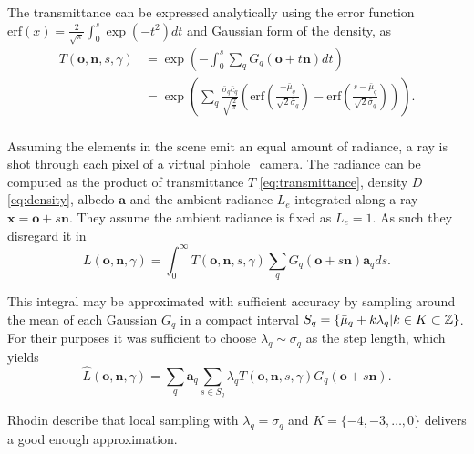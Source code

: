 \documentclass[a4paper, 11pt]{memoir}
\newcommand*{\erf}{\text{erf}}
\begin{document}
    The \gls{transmittance} can be expressed analytically using the error function
    $\erf{(x)} = \frac{2}{\sqrt{\pi}}\int_0^s \exp{(-t^2)} dt$ and Gaussian form of the density, as
    \begin{equation}
        \begin{aligned}
            T(\mathbf{o}, \mathbf{n}, s, \gamma) &= \exp{\left( -\int_0^s
                \sum_q G_q(\mathbf{o} + t\mathbf{n} ) dt \right)}\\
            &= \exp{\left( \sum_q \frac{\bar{\sigma}_q \bar{c}_q}{\sqrt{\frac{2}{\pi}}}
            \left( \erf{\left( \frac{-\bar{\mu}_q}{\sqrt{2}\bar{\sigma}_q} \right)}
            - \erf{\left( \frac{s - \bar{\mu}_q}{\sqrt{2}\bar{\sigma}_q} \right)} \right) \right)}.\\
        \end{aligned}
        \label{eq:transmittance_analytical}
    \end{equation}

    Assuming the elements in the scene emit an equal amount of \gls{radiance}, a ray is shot through each pixel of a virtual
    \gls{pinhole_camera}. The \gls{radiance} can be computed as the product of \gls{transmittance} $T$ \eqref{eq:transmittance},
    density $D$ \eqref{eq:density}, \gls{albedo} $\mathbf{a}$ and the ambient \gls{radiance} $L_e$ integrated along a ray
    $\mathbf{x} = \mathbf{o} + s\mathbf{n}$. They assume the ambient \gls{radiance} is fixed as $L_e = 1$. As such they
    disregard it in
    \begin{equation}
        L(\mathbf{o}, \mathbf{n}, \gamma) = \int_0^\infty T(\mathbf{o}, \mathbf{n}, s, \gamma)
            \sum_q G_q(\mathbf{o} + s\mathbf{n})\mathbf{a}_q ds.
    \end{equation}
    
    This integral may be approximated with sufficient accuracy by sampling around the mean of each Gaussian $G_q$ in
    a compact interval $S_q = \{ \bar{\mu}_q + k\lambda_q | k \in K \subset \mathbb{Z} \}$. For their purposes it was sufficient
    to choose $\lambda_q \sim \bar{\sigma}_q$ as the step length, which yields
    \begin{equation}
        \hat{L}(\mathbf{o}, \mathbf{n}, \gamma) = \sum_q \mathbf{a}_q \sum_{s \in S_q}
            \lambda_q T(\mathbf{o}, \mathbf{n}, s, \gamma)G_q(\mathbf{o} + s\mathbf{n}).
        \label{eq:radiance}
    \end{equation}

    Rhodin \etal describe that local sampling with $\lambda_q = \bar{\sigma}_q$ and $K = \{ -4, -3, \dots, 0 \}$
    delivers a good enough approximation.
\end{document}
